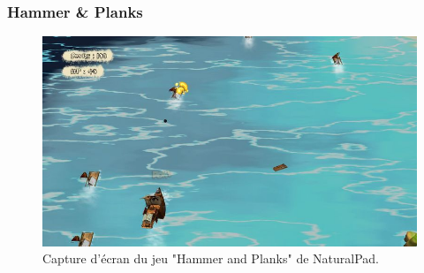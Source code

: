 
\subsubsection{Hammer \& Planks}

\begin{figure}[h!]
\centering
\includegraphics[width=1.0\linewidth]{images/hammer_and_planks}
\caption{Capture d'écran du jeu "Hammer and Planks" de 
NaturalPad.}
\end{figure}

